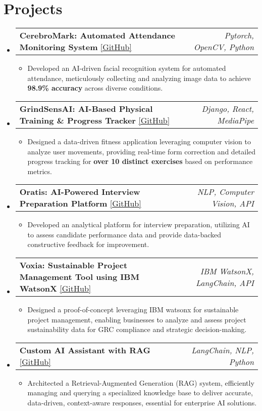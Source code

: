 \documentclass[letterpaper,10pt]{article}
\makeatletter
\newcommand{\resumeItem}[1]{\item\small{#1\vspace{-2pt}}}
\newcommand{\resumeProjectHeading}[3]{
    \item
    \begin{tabular*}{0.97\textwidth}{l@{\extracolsep{\fill}}r}
      \textbf{#1} \href{#2}{\small[GitHub]} & \textit{\small#3} \\
    \end{tabular*}\vspace{-2pt}
}
\newcommand{\resumeSubHeadingListStart}{\begin{itemize}[leftmargin=0.15in, label={}]}
\newcommand{\resumeSubHeadingListEnd}{\end{itemize}}
\newcommand{\resumeItemListStart}{\begin{itemize}[leftmargin=0.15in, itemsep=-3pt, topsep=0pt]}
\makeatother
\begin{document}
\section{Projects}
\resumeSubHeadingListStart
    \resumeProjectHeading
        {CerebroMark: Automated Attendance Monitoring System}
        {https://github.com/Ronin-117/Automated_attendance}
        {Pytorch, OpenCV, Python}
    \resumeItemListStart
        \resumeItem{Developed an AI-driven facial recognition system for automated attendance, meticulously collecting and analyzing image data to achieve \textbf{98.9\% accuracy} across diverse conditions.}
    \end{itemize}

    \resumeProjectHeading
        {GrindSensAI: AI-Based Physical Training \& Progress Tracker}
        {https://github.com/Ronin-117/GrindSensAI}
        {Django, React, MediaPipe}
    \resumeItemListStart
        \resumeItem{Designed a data-driven fitness application leveraging computer vision to analyze user movements, providing real-time form correction and detailed progress tracking for \textbf{over 10 distinct exercises} based on performance metrics.}
    \end{itemize}
    
    \resumeProjectHeading
        {Oratis: AI-Powered Interview Preparation Platform}
        {https://github.com/Ronin-117/Mock_Online_InterviewAi}
        {NLP, Computer Vision, API}
    \resumeItemListStart
        \resumeItem{Developed an analytical platform for interview preparation, utilizing AI to assess candidate performance data and provide data-backed constructive feedback for improvement.}
    \end{itemize}
    
    \resumeProjectHeading
        {Voxia: Sustainable Project Management Tool using IBM WatsonX}
        {https://github.com/Ronin-117/sustainability-tool}
        {IBM WatsonX, LangChain, API}
    \resumeItemListStart
        \resumeItem{Designed a proof-of-concept leveraging IBM watsonx for sustainable project management, enabling businesses to analyze and assess project sustainability data for GRC compliance and strategic decision-making.}
    \end{itemize}
    
    \resumeProjectHeading
        {Custom AI Assistant with RAG}
        {https://github.com/Ronin-117/lang_chain_test}
        {LangChain, NLP, Python}
    \resumeItemListStart
        \resumeItem{Architected a Retrieval-Augmented Generation (RAG) system, efficiently managing and querying a specialized knowledge base to deliver accurate, data-driven, context-aware responses, essential for enterprise AI solutions.}
    \end{itemize}
\resumeSubHeadingListEnd
\end{document}
